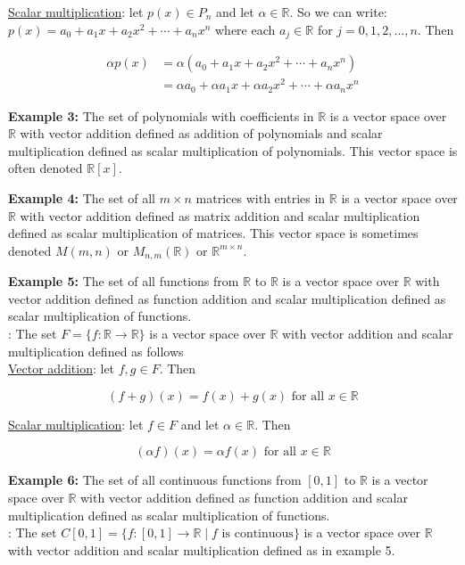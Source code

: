 \documentclass[12pt]{article}
\begin{document}
\underline{Scalar multiplication}: let $p(x)\in P_n$ and let $\alpha \in \mathbb{R}$.  So we can write: $p(x)=a_0 + a_1 x +a_2 x^2 + \cdots + a_n x^n$ where each $a_j\in \mathbb{R}$ for $j=0,1,2,\ldots,n$.  Then

\begin{align*}
\alpha p(x) &= \alpha(a_0 + a_1 x +a_2 x^2 + \cdots + a_n x^n)\\ 
 &= \alpha a_0 + \alpha a_1 x +\alpha a_2 x^2 + \cdots +\alpha a_n x^n
\end{align*}

{\bf Example 3:} The set of polynomials with coefficients in $\mathbb{R}$ is a vector space over $\mathbb{R}$ with vector addition defined as addition of polynomials and scalar multiplication defined as scalar multiplication of polynomials.  This vector space is often denoted $\mathbb{R}[x]$.

{\bf Example 4:} The set of all $m\times n$ matrices with entries in $\mathbb{R}$ is a vector space over $\mathbb{R}$ with vector addition defined as matrix addition and scalar multiplication defined as scalar multiplication of matrices.  This vector space is sometimes denoted $M(m, n)$ or $M_{n,m}(\mathbb{R})$ or $\mathbb{R}^{m\times n}$.

{\bf Example 5:} The set of all functions from $\mathbb{R}$ to $\mathbb{R}$ is a vector space over $\mathbb{R}$ with vector addition defined as function addition and scalar multiplication defined as scalar multiplication of functions.\\

:  The set $F= \{ f{:}\mathbb{R}\rightarrow\mathbb{R} \}$ is a vector space over $\mathbb{R}$ with vector addition and scalar multiplication defined as follows\\

\underline{Vector addition}: let $f,g\in F$.  Then

\[ (f+g)(x)=f(x)+g(x) \text{ for all } x\in \mathbb{R} \]


\underline{Scalar multiplication}: let $f\in F$ and let $\alpha \in \mathbb{R}$.  Then

\[ (\alpha f)(x)=\alpha f(x)\text{ for all } x\in \mathbb{R} \]

{\bf Example 6:} The set of all continuous functions from $[0,1]$ to $\mathbb{R}$ is a vector space over $\mathbb{R}$ with vector addition defined as function addition and scalar multiplication defined as scalar multiplication of functions.\\

:  The set $C[0,1]= \{ f{:}[0,1]\rightarrow\mathbb{R} \mid f \text{ is continuous} \}$ is a vector space over $\mathbb{R}$ with vector addition and scalar multiplication defined as in example 5.
\end{document}
